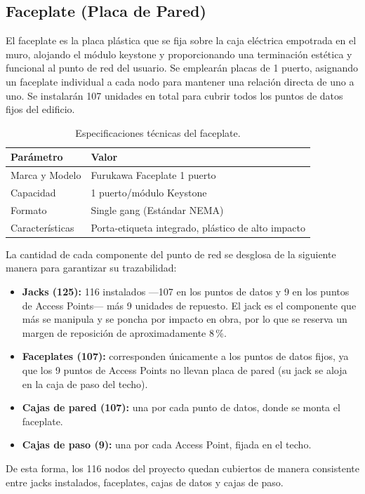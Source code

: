 \subsection{Faceplate (Placa de Pared)}
El faceplate es la placa plástica que se fija sobre la caja eléctrica empotrada en el muro, alojando el módulo keystone y proporcionando una terminación estética y funcional al punto de red del usuario. Se emplearán placas de 1 puerto, asignando un faceplate individual a cada nodo para mantener una relación directa de uno a uno. Se instalarán 107 unidades en total para cubrir todos los puntos de datos fijos del edificio.

\begin{table}[H]
\centering
\caption{Especificaciones técnicas del faceplate.}
\label{tab:spec_faceplate}
\begin{tabular}{lp{9cm}}
\hline
\textbf{Parámetro} & \textbf{Valor} \\
\hline
Marca y Modelo & Furukawa Faceplate 1 puerto \\
Capacidad & 1 puerto/módulo Keystone \\
Formato & Single gang (Estándar NEMA) \\
Características & Porta-etiqueta integrado, plástico de alto impacto \\
\hline
\end{tabular}
\end{table}

La cantidad de cada componente del punto de red se desglosa de la siguiente manera para garantizar su trazabilidad:
\begin{itemize}[label=$\bullet$,leftmargin=1.4em]
    \item \textbf{Jacks (125):} 116 instalados ---107 en los puntos de datos y 9 en los puntos de Access Points--- más 9 unidades de repuesto. El jack es el componente que más se manipula y se poncha por impacto en obra, por lo que se reserva un margen de reposición de aproximadamente 8\,\%.
    \item \textbf{Faceplates (107):} corresponden únicamente a los puntos de datos fijos, ya que los 9 puntos de Access Points no llevan placa de pared (su jack se aloja en la caja de paso del techo).
    \item \textbf{Cajas de pared (107):} una por cada punto de datos, donde se monta el faceplate.
    \item \textbf{Cajas de paso (9):} una por cada Access Point, fijada en el techo.
\end{itemize}
De esta forma, los 116 nodos del proyecto quedan cubiertos de manera consistente entre jacks instalados, faceplates, cajas de datos y cajas de paso.

